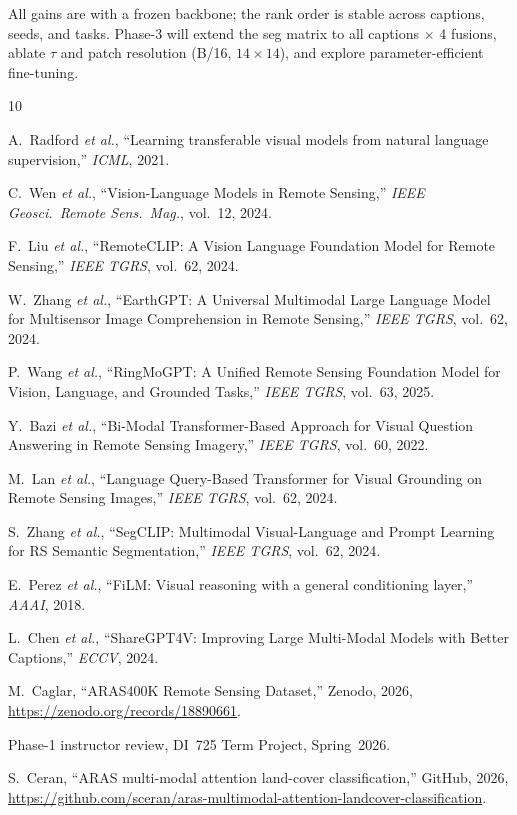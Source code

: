 \documentclass[conference]{IEEEtran}
\begin{document}
All gains are with a frozen backbone; the rank order is stable across captions, seeds, and tasks. Phase-3 will extend the seg matrix to all captions $\times$ 4 fusions, ablate $\tau$ and patch resolution (B/16, $14{\times}14$), and explore parameter-efficient fine-tuning.

\scriptsize
\setlength{\IEEEilabelindent}{0pt}
\setlength{\IEEEiednormlabelsep}{0pt}
\renewcommand{\IEEEbibitemsep}{0pt plus 0.3pt}
\begin{thebibliography}{10}

A.~Radford \emph{et al.}, ``Learning transferable visual models from natural language supervision,'' \emph{ICML}, 2021.

C.~Wen \emph{et al.}, ``Vision-Language Models in Remote Sensing,'' \emph{IEEE Geosci.\ Remote Sens.\ Mag.}, vol.~12, 2024.

F.~Liu \emph{et al.}, ``RemoteCLIP: A Vision Language Foundation Model for Remote Sensing,'' \emph{IEEE TGRS}, vol.~62, 2024.

W.~Zhang \emph{et al.}, ``EarthGPT: A Universal Multimodal Large Language Model for Multisensor Image Comprehension in Remote Sensing,'' \emph{IEEE TGRS}, vol.~62, 2024.

P.~Wang \emph{et al.}, ``RingMoGPT: A Unified Remote Sensing Foundation Model for Vision, Language, and Grounded Tasks,'' \emph{IEEE TGRS}, vol.~63, 2025.

Y.~Bazi \emph{et al.}, ``Bi-Modal Transformer-Based Approach for Visual Question Answering in Remote Sensing Imagery,'' \emph{IEEE TGRS}, vol.~60, 2022.

M.~Lan \emph{et al.}, ``Language Query-Based Transformer for Visual Grounding on Remote Sensing Images,'' \emph{IEEE TGRS}, vol.~62, 2024.

S.~Zhang \emph{et al.}, ``SegCLIP: Multimodal Visual-Language and Prompt Learning for RS Semantic Segmentation,'' \emph{IEEE TGRS}, vol.~62, 2024.

E.~Perez \emph{et al.}, ``FiLM: Visual reasoning with a general conditioning layer,'' \emph{AAAI}, 2018.

L.~Chen \emph{et al.}, ``ShareGPT4V: Improving Large Multi-Modal Models with Better Captions,'' \emph{ECCV}, 2024.

M.~Caglar, ``ARAS400K Remote Sensing Dataset,'' Zenodo, 2026, \url{https://zenodo.org/records/18890661}.

Phase-1 instructor review, DI~725 Term Project, Spring~2026.

S.~Ceran, ``ARAS multi-modal attention land-cover classification,'' GitHub, 2026, \url{https://github.com/sceran/aras-multimodal-attention-landcover-classification}.

\end{thebibliography}
\end{document}

